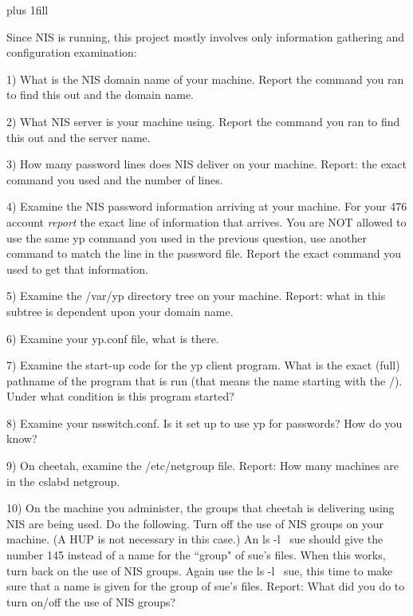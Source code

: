 
\rightskip=0pt plus 1fill

\parindent 0pt

Since NIS is running, this project mostly involves only
information gathering and configuration examination:

1) What is the NIS domain name of your machine.
Report the command you ran to find this out and the domain name.

2) What NIS server is your machine using.
Report the command you ran to find this out and the server name.

3) How many password lines does NIS deliver on your machine.
Report: the exact command you used and the number of lines.

4) Examine the NIS password information arriving at your machine.
For your 476 account {\it report} the exact line of 
information that arrives.
You are NOT allowed to use the same yp command you used in the previous
question, use another command to match the line in the password file.
Report the exact command you used to get that information.

5) Examine the {\ltt{}/var/yp} directory tree on your machine.
Report: what in this subtree is dependent upon your domain name.

6) Examine your {\ltt{}yp.conf} file, what is there.

7) Examine the start-up code for the yp client program.
What is the exact (full) pathname of the program that is run
(that means the name starting with the {\ltt{}/}).
Under what condition is this program started?

8) Examine your {\ltt{}nsswitch.conf}.
Is it set up to use yp for passwords?
How do you know?

9)  On cheetah, examine the {\ltt{}/etc/netgroup} file.
Report: How many machines are in the {\ltt{}cslabd} netgroup.

10) On the machine you administer, the groups that {\ltt{}cheetah} is
delivering using NIS are being used. 
Do the following.
Turn off the use of NIS groups on your machine.
(A HUP is not necessary in this case.)
An {\ltt{}ls -l ~sue} should give the number 145
instead of a name for the ``group" of sue's files.
When this works, turn back on the use of NIS groups.
Again use the {\ltt{}ls -l ~sue}, this time to make sure
that a name is given for the group of sue's files.
Report: What did you do to turn on/off the use of NIS groups?
\bye

